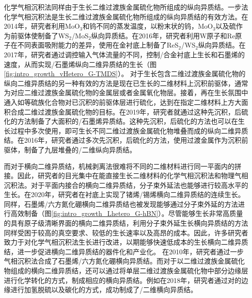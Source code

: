     化学气相沉积法同样由于生长二维过渡族金属硫化物所组成的纵向异质结。一步法化学气相沉积法是生长二维过渡族金属硫化物所组成的纵向异质结的有效方法。在2014年，研究者利用MoO$_3$和钨不同的蒸发温度，以粉末状的钨，MoO$_3$以及硫作为前驱体使制备了WS$_2$/MoS$_2$纵向异质结。在2016年，研究者利用W原子和Re原子在不同表面吸附能力的差异，使用在金衬底上制备了ReS$_2$/WS$_2$纵向异质结。在2017年，研究者通过调控输入气体流量的不同，控制/合金衬底上生长和石墨烯的速度，从而实现/石墨烯纵向二维异质结的生长（图\ref{fig:intro_growth_vHetero_G-TMDS}）。
    对于生长包含二维过渡族金属硫化物的纵向二维异质结的另一种有效的方法是现在已生长的二维材料上沉积前驱体，通常为对应二维过渡族金属硫化物的金属层或者金属氧化物层。接着，再在生长氛围中通入如等硫族化合物对已沉积的前驱体层进行硫化，达到在指定二维材料上方大面积合成二维过渡族金属硫化物的目标。在2019年，研究者就通过这种先沉积，后硫化的方法制备了大面积的/石墨烯异质结。这种先沉积，后硫化的方法也可以在生长过程中多次使用，即可生长不同二维过渡族金属硫化物堆叠而成的纵向二维异质结。在2016年，研究者通过多次先沉积，后硫化的方法，使用过渡金属作为沉积前驱体，制备了九层堆叠的/二维纵向异质结。

    而对于横向二维异质结，机械剥离法很难将不同的二维材料进行同一平面内的拼接。因此，研究者的目光集中在能直接生长二维材料的化学气相沉积法和物理气相沉积法。对于平面内接合的横向二维异质结，分子束外延法也能够进行较高水平的生长。在2020年，研究者在衬底上实现了锗烯/锡烯横向二维异质结的连续生长。同样，石墨烯/六方氮化硼横向二维异质结也被发现能够通过分子束外延的方法进行高效制备（图\ref{fig:intro_growth_Lhetero_G-hBN}）。尽管能够生长非常高质量的具有原子级清晰界面的横向二维异质结，利用分子束外延生长横向异质结的方法同样受困于较高的真空要求、较低的生长速率以及高昂的成本。因此，许多研究者致力于对化学气相沉积法生长进行改进，以期能够快速低成本的生长横向二维异质结，进一步促进横向二维异质结的器件化和产业化。
    在2010年，研究者通过一步气相沉积法合成了石墨烯/六方氮化硼横向异质结。而对于以二维过渡族金属硫化物组成的横向二维异质结，还可以通过将单层二维过渡族金属硫化物中部分边缘层进行化学转化的方式，制成相应的横向异质结。例如在2018年，研究者通过对的边缘进行加氢脱硫以及碳化的方式，成功制成了/二维横向异质结。

